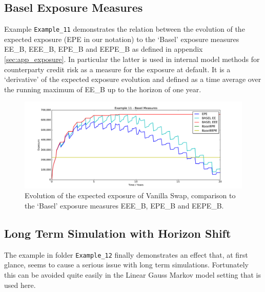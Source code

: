 \documentclass[12pt, a4paper]{article}
\begin{document}
\subsection{Basel Exposure Measures}\label{sec:basel}

Example {\tt Example\_11} demonstrates the relation between the evolution of the expected exposure (EPE in our notation)
to the `Basel' exposure measures EE\_B, EEE\_B, EPE\_B and EEPE\_B as defined in appendix \ref{sec:app_exposure}. In
particular the latter is used in internal model methods for counterparty credit risk as a measure for the exposure at
default. It is a `derivative' of the expected exposure evolution and defined as a time average over the running maximum
of EE\_B up to the horizon of one year.
\begin{figure}[h!]
\begin{center}
\includegraphics[scale=0.45]{mpl_basel_exposures.pdf}
\end{center}
\caption{Evolution of the expected exposure of Vanilla Swap, comparison to the `Basel' exposure measures EEE\_B, EPE\_B and EEPE\_B.}
\label{fig_14}
\end{figure}

\subsection{Long Term Simulation with Horizon Shift}\label{sec:longterm}

The example in folder {\tt Example\_12} finally demonstrates an effect that, at first glance, seems to cause a serious
issue with long term simulations. Fortunately this can be avoided quite easily in the Linear Gauss Markov model setting
that is used here. \\
\end{document}
